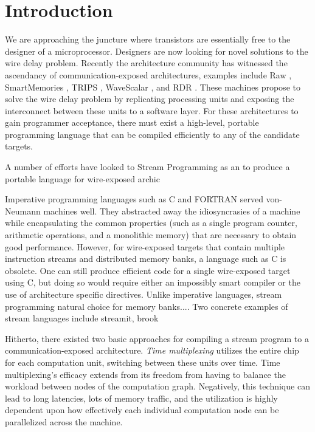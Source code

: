 \section{Introduction}

We are approaching the juncture where transistors are essentially free
to the designer of a microprocessor.  Designers are now looking for
novel solutions to the wire delay problem. Recently the architecture
community has witnessed the ascendancy of communication-exposed
architectures, examples include Raw
\cite{raw, raw_isca}, SmartMemories \cite{smartmemories}, TRIPS \cite{trips},
WaveScalar \cite{wavescalar}, and RDR \cite{rdr}.  These
machines propose to solve the wire delay problem by replicating
processing units and exposing the interconnect between these units to
a software layer.  For these architectures to gain programmer
acceptance, there must exist a high-level, portable programming
language that can be compiled efficiently to any of the candidate
targets.  


A number of efforts have looked to Stream Programming as an  to
produce a portable language for wire-exposed archic

Imperative programming languages such as C and FORTRAN served
von-Neumann machines well.  They abstracted away the idiosyncrasies of
a machine while encapsulating the common properties (such as a single
program counter, arithmetic operations, and a monolithic memory) that
are necessary to obtain good performance.  However, for wire-exposed
targets that contain multiple instruction streams and distributed
memory banks, a language such as C is obsolete.  One can
still produce efficient code for a single wire-exposed target using C,
but doing so would require either an impossibly smart compiler or the use
of architecture specific directives.
Unlike imperative languages, stream programming natural choice for
memory banks....
Two concrete examples of stream languages include streamit, brook

Hitherto, there existed two basic approaches for compiling a
stream program to a communication-exposed architecture.  
{\it Time multiplexing} utilizes the entire chip for each computation unit,
switching between these units over time.  Time multiplexing's efficacy
extends from its freedom from having to balance the workload between
nodes of the computation graph.  Negatively, this technique can lead
to long latencies, lots of memory traffic, and the utilization is
highly dependent upon how effectively each individual computation node
can be parallelized across the machine.

